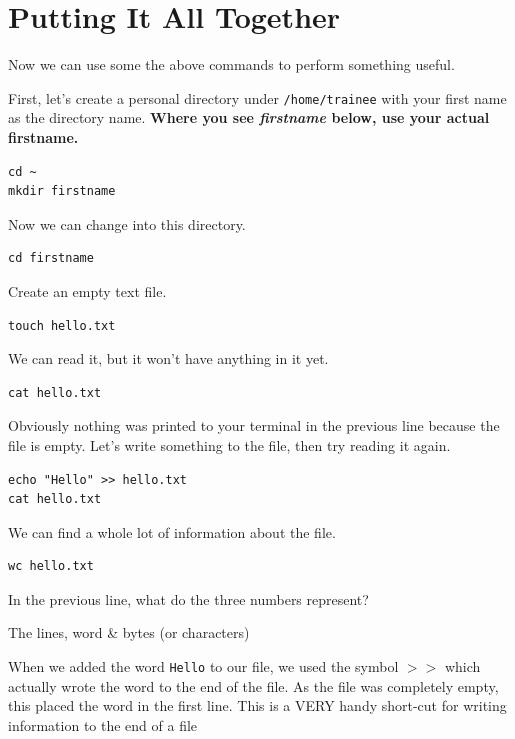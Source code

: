 \section{Putting It All Together}
Now we can use some the above commands to perform something useful. \\

\begin{steps}
First, let's create a personal directory under \texttt{/home/trainee} with your first name as the directory name.
\textbf{Where you see \textit{firstname} below, use your actual firstname.}\\
\begin{lstlisting}
cd ~
mkdir firstname
\end{lstlisting}

Now we can change into this directory.
\begin{lstlisting}
cd firstname
\end{lstlisting}

Create an empty text file.
\begin{lstlisting}
touch hello.txt
\end{lstlisting}

We can read it, but it won't have anything in it yet.
\begin{lstlisting}
cat hello.txt
\end{lstlisting}

Obviously nothing was printed to your terminal in the previous line because the file is empty.
Let's write something to the file, then try reading it again.
\begin{lstlisting}
echo "Hello" >> hello.txt
cat hello.txt
\end{lstlisting}

We can find a whole lot of information about the file.
\begin{lstlisting}
wc hello.txt
\end{lstlisting}
\end{steps}

\begin{questions}
In the previous line, what do the three numbers represent?
\begin{answer}
The lines, word \& bytes (or characters)
\end{answer}
\end{questions}

\begin{information}
When we added the word \texttt{Hello} to our file, we used the symbol $>>$ which actually wrote the word to the end of the file.
As the file was completely empty, this placed the word in the first line.
This is a VERY handy short-cut for writing information to the end of a file
\end{information}

